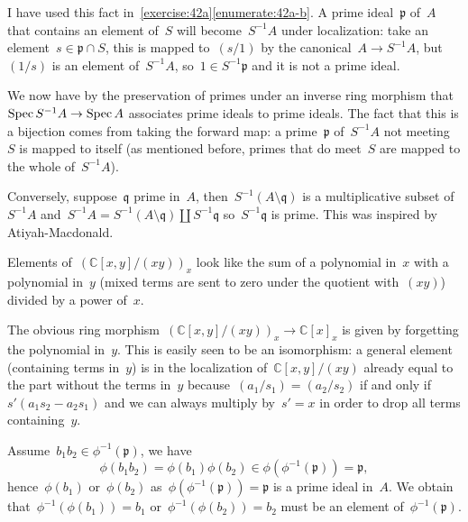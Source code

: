 \begin{exercise}
  \label{exercise:42h}
  I have used this fact in~\autoref{exercise:42a}\ref{enumerate:42a-b}. A prime ideal~$\mathfrak{p}$ of~$A$ that contains an element of~$S$ will become~$S^{-1}A$ under localization: take an element~$s\in\mathfrak{p}\cap S$, this is mapped to~$(s/1)$ by the canonical~$A\to S^{-1}A$, but~$(1/s)$ is an element of~$S^{-1}A$, so~$1\in S^{-1}\mathfrak{p}$ and it is not a prime ideal.

  We now have by the preservation of primes under an inverse ring morphism that~$\operatorname{Spec} S^{-1}A\to\operatorname{Spec} A$ associates prime ideals to prime ideals. The fact that this is a bijection comes from taking the forward map: a prime~$\mathfrak{p}$ of~$S^{-1}A$ not meeting~$S$ is mapped to itself (as mentioned before, primes that do meet~$S$ are mapped to the whole of~$S^{-1}A$).
  
  Conversely, suppose~$\mathfrak{q}$ prime in~$A$, then~$S^{-1}(A\setminus\mathfrak{q})$ is a multiplicative subset of~$S^{-1}A$ and~$S^{-1}A=S^{-1}(A\setminus\mathfrak{q})\coprod S^{-1}\mathfrak{q}$ so~$S^{-1}\mathfrak{q}$ is prime. This was inspired by Atiyah-Macdonald.
\end{exercise}

\begin{exercise}
  Elements of~$(\mathbb{C}[x,y]/(xy))_x$ look like the sum of a polynomial in~$x$ with a polynomial in~$y$ (mixed terms are sent to zero under the quotient with~$(xy)$) divided by a power of~$x$.
  
  The obvious ring morphism~$(\mathbb{C}[x,y]/(xy))_x\to\mathbb{C}[x]_x$ is given by forgetting the polynomial in~$y$. This is easily seen to be an isomorphism: a general element (containing terms in~$y$) is in the localization of~$\mathbb{C}[x,y]/(xy)$ already equal to the part without the terms in~$y$ because~$(a_1/s_1)=(a_2/s_2)$ if and only if~$s'(a_1s_2-a_2s_1)$ and we can always multiply by~$s'=x$ in order to drop all terms containing~$y$.
\end{exercise}

\begin{exercise}
  \label{exercise:42j}
  Assume~$b_1b_2\in\phi^{-1}(\mathfrak{p})$, we have
  \begin{equation}
    \phi(b_1b_2)=\phi(b_1)\phi(b_2)\in\phi\left( \phi^{-1}(\mathfrak{p}) \right)=\mathfrak{p},
  \end{equation}
  hence~$\phi(b_1)$ or~$\phi(b_2)$ as~$\phi(\phi^{-1}(\mathfrak{p}))=\mathfrak{p}$ is a prime ideal in~$A$. We obtain that~$\phi^{-1}(\phi(b_1))=b_1$ or~$\phi^{-1}(\phi(b_2))=b_2$ must be an element of~$\phi^{-1}(\mathfrak{p})$.
\end{exercise}

